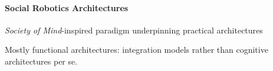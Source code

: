 \documentclass[11pt,a4paper]{report}
\begin{document}
\paragraph{Social Robotics Architectures}\label{sec:robots}


\emph{Society of Mind}-inspired paradigm underpinning practical architectures

Mostly functional architectures: integration models rather than cognitive
architectures per se.

%
%
%
%
%
%
%
%
%
\end{document}

